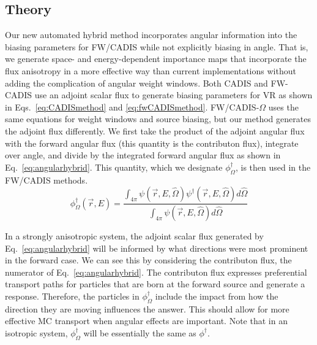 \documentclass[12pt]{article}
\begin{document}
\subsection{Theory}
\label{subsect::theory}

Our new automated hybrid method incorporates angular information into the biasing parameters for FW/CADIS while not explicitly biasing in angle. 
That is, we generate space- and energy-dependent importance maps that incorporate the flux anisotropy in a more effective way than current implementations without adding the complication of angular weight windows. 
Both CADIS and FW-CADIS use an adjoint scalar flux to generate biasing parameters for VR as shown in Eqs.~\eqref{eq:CADISmethod} and \eqref{eq:fwCADISmethod}. 
FW/CADIS-$\Omega$ uses the same equations for weight windows and source biasing, but our method generates the adjoint flux differently. 
We first take the product of the adjoint angular flux with the forward angular flux (this quantity is the contributon flux), integrate over angle, and divide by the integrated forward angular flux as shown in Eq.~\eqref{eq:angularhybrid}.
This quantity, which we designate $\phi^{\dagger}_{\Omega}$, is then used in the FW/CADIS methods.
%
\begin{equation} 
\phi^{\dagger}_{\Omega}(\vec{r},E) = \frac{\int_{4\pi} \psi(\vec {r} ,E,\hat{\Omega})\psi^{\dagger}(\vec {r} ,E,\hat{\Omega})d\hat\Omega }{\int_{4\pi}\psi(\vec {r} ,E,\hat{\Omega})d\hat\Omega}
\label{eq:angularhybrid}
\end{equation}

In a strongly anisotropic system, the adjoint scalar flux generated by Eq.~\eqref{eq:angularhybrid} will be informed by what directions were most prominent in the forward case. 
We can see this by considering the contributon flux, the numerator of Eq.~\eqref{eq:angularhybrid}.
The contributon flux expresses preferential transport paths for particles that are born at the forward source and generate a response.
Therefore, the particles in $\phi^{\dagger}_{\Omega}$ include the impact from how the direction they are moving influences the answer. 
This should allow for more effective MC transport when angular effects are important. 
Note that in an isotropic system, $\phi^{\dagger}_{\Omega}$ will be essentially the same as $\phi^{\dagger}$. 

\end{document}
